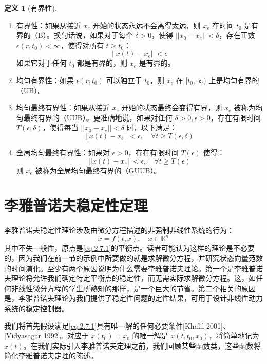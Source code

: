 \documentclass[UTF8,12pt,a4paper]{ctexart}
\theoremstyle{definition}
\newtheorem{definition}{定义}[section]
\begin{document}
\begin{definition}[有界性]
\begin{enumerate}
\item 有界性：如果从接近 $x_e$ 开始的状态永远不会离得太远，则 $x_e$ 在时间 $t_0$ 是有界的（B）。换句话说，如果对于每个 $\delta > 0$，使得 $||x_0 - x_e|| < \delta$，存在正数 $\epsilon(r, t_0) < \infty$，使得对所有 $t \geq t_0$：
\[
||x(t) - x_e|| < \epsilon
\]
如果它对于任何 $t_0$ 都是有界的，则 $x_e$ 是有界的。

\item 均匀有界性：如果 $\epsilon(r, t_0)$ 可以独立于 $t_0$，则 $x_e$ 在 $[t_0, \infty)$ 上是均匀有界的（UB）。

\item 均匀最终有界性：如果从接近 $x_e$ 开始的状态最终会变得有界，则 $x_e$ 被称为均匀最终有界的（UUB）。更准确地说，如果对任何 $\delta > 0, \epsilon > 0$，存在有限时间 $T(\epsilon, \delta)$，使得每当 $||x_0 - x_e|| < \delta$ 时，以下满足：
\[
||x(t) - x_e|| < \epsilon, \quad \forall t \geq T(\epsilon, \delta)
\]

\item 全局均匀最终有界性：如果对 $\epsilon > 0$，存在有限时间 $T(\epsilon)$ 使得：
\[
||x(t) - x_e|| < \epsilon, \quad \forall t \geq T(\epsilon)
\]
则 $x_e$ 被称为全局均匀最终有界的（GUUB）。
\end{enumerate}
\end{definition}

\section{李雅普诺夫稳定性定理}

李雅普诺夫稳定性理论涉及由微分方程描述的非强制非线性系统的行为：
\begin{equation}\label{eq:2.7.1}
\dot{x} = f(t, x), \quad x \in \mathbb{R}^n
\end{equation}
其中不失一般性，原点是\eqref{eq:2.7.1}的平衡点。读者可能认为这样的理论是不必要的，因为我们在前一节的示例中所要做的就是求解微分方程，并研究状态向量范数的时间演化。至少有两个原因说明为什么需要李雅普诺夫理论。第一个是李雅普诺夫理论将允许我们确定特定平衡点的稳定性，而无需实际求解微分方程。这，如任何非线性微分方程的学生所熟知的那样，是一个巨大的节省。第二个相关的原因是，李雅普诺夫理论为我们提供了稳定性问题的定性结果，可用于设计非线性动力系统的稳定控制器。

我们将首先假设满足\eqref{eq:2.7.1}具有唯一解的任何必要条件[Khalil 2001]、[Vidyasagar 1992]。对应于 $x(t_0)=x_0$ 的唯一解是 $x(t, t_0, x_0)$，将简单地记为 $x(t)$。在我们实际引入李雅普诺夫定理之前，我们回顾某些函数类，这些函数将简化李雅普诺夫定理的陈述。
\end{document}
